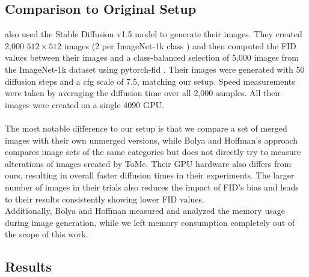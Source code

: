 \subsection{Comparison to Original Setup}
\cite{bolya2023tomesd} also used the Stable Diffusion v1.5 model to generate their images. They created 2,000 $512 \times 512$ images (2 per ImageNet-1k class \cite{deng2009imagenet}) and then computed the FID values between their images and a class-balanced selection of 5,000 images from the ImageNet-1k dataset using pytorch-fid \cite{Seitzer2020FID}. Their images were generated with 50 diffusion steps and a cfg scale of 7.5, matching our setup. Speed measurements were taken by averaging the diffusion time over all 2,000 samples. All their images were created on a single 4090 GPU.\\
\\
The most notable difference to our setup is that we compare a set of merged images with their own unmerged versions, while Bolya and Hoffman's approach compares image sets of the same categories but does not directly try to measure alterations of images created by ToMe. Their GPU hardware also differs from ours, resulting in overall faster diffusion times in their experiments. The larger number of images in their trials also reduces the impact of FID's bias and leads to their results consistently showing lower FID values.\\
Additionally, Bolya and Hoffman measured and analyzed the memory usage during image generation, while we left memory consumption completely out of the scope of this work.



\subsection{Results}




